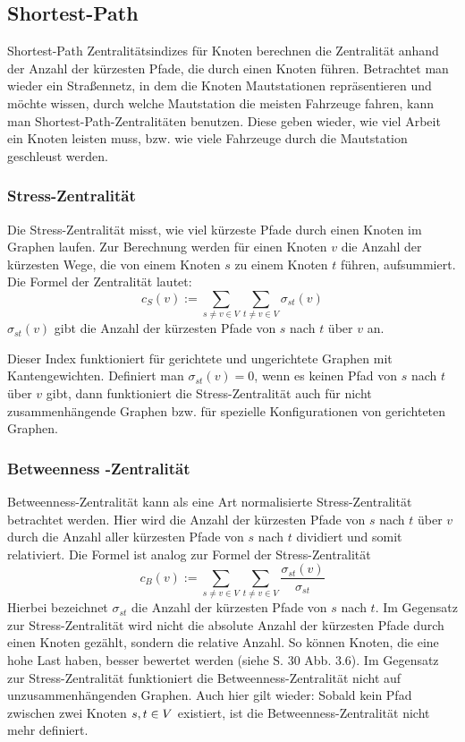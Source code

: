 \subsection{Shortest-Path}

Shortest-Path Zentralitätsindizes für Knoten berechnen die Zentralität anhand der Anzahl der kürzesten Pfade, die durch einen Knoten führen. Betrachtet man wieder ein Straßennetz, in dem die Knoten Mautstationen repräsentieren und möchte wissen, durch welche Mautstation die meisten Fahrzeuge fahren, kann man Shortest-Path-Zentralitäten benutzen. Diese geben wieder, wie viel Arbeit ein Knoten leisten muss, bzw. wie viele Fahrzeuge durch die Mautstation geschleust werden. 

\subsubsection{Stress-Zentralität}

Die Stress-Zentralität misst, wie viel kürzeste Pfade durch einen Knoten im Graphen laufen. Zur Berechnung werden für einen Knoten $v$ die Anzahl der kürzesten Wege, die von einem Knoten $s$ zu einem Knoten $t$ führen, aufsummiert. Die Formel der Zentralität lautet: 
\[c_S(v) := \sum_{s \neq v \in V}\sum_{t \neq v \in V}\sigma_{st}(v)\]
 $\sigma_{st}(v)$ gibt die Anzahl der kürzesten Pfade von $s$ nach $t$ über $v$ an.

Dieser Index funktioniert für gerichtete und ungerichtete Graphen mit Kantengewichten. Definiert man $\sigma_{st}(v) = 0$, wenn es keinen Pfad von $s$ nach $t$ über $v$ gibt, dann funktioniert die Stress-Zentralität auch für nicht zusammenhängende Graphen bzw. für spezielle Konfigurationen von gerichteten Graphen.

\subsubsection{Betweenness -Zentralität}

Betweenness-Zentralität kann als eine Art normalisierte Stress-Zentralität betrachtet werden. Hier wird die Anzahl der kürzesten Pfade von $s$ nach $t$ über $v$ durch die Anzahl aller kürzesten Pfade von $s$ nach $t$ dividiert und somit relativiert. Die Formel ist analog zur Formel der Stress-Zentralität 
\[c_B(v) := \sum_{s \neq v \in V}\sum_{t \neq v \in V}\frac{\sigma_{st}(v)}{\sigma_{st}}\]
Hierbei bezeichnet $\sigma_{st}$ die Anzahl der kürzesten Pfade von $s$ nach $t$. Im Gegensatz zur Stress-Zentralität wird nicht die absolute Anzahl der kürzesten Pfade durch einen Knoten gezählt, sondern die relative Anzahl. So können Knoten, die eine hohe Last haben, besser bewertet werden (siehe \citep{Brandes2005} S. 30 Abb. 3.6).
Im Gegensatz zur Stress-Zentralität funktioniert die Betweenness-Zentralität nicht auf unzusammenhängenden Graphen. Auch hier gilt wieder: Sobald kein Pfad zwischen zwei Knoten $s,t \in V$ existiert, ist die Betweenness-Zentralität nicht mehr definiert. 

